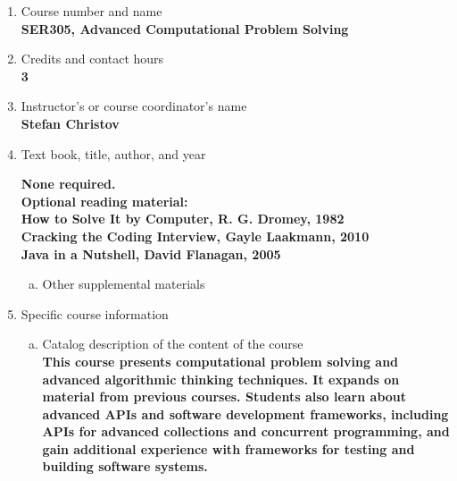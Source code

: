 \label{SER305}  %
\begin{enumerate}[1.]
\item Course number and name\\
  {\bfseries
    SER305, Advanced Computational Problem Solving
  }
  
\item Credits and contact hours\\
  {\bfseries
    3  %
  }

\item Instructor's or course coordinator's name\\
  {\bfseries
    Stefan Christov
  }

\item Text book, title, author, and year\\
  {\bfseries
    None required.\\
    Optional reading material:\\
    How to Solve It by Computer, R. G. Dromey, 1982\\
    Cracking the Coding Interview, Gayle Laakmann, 2010\\
    Java in a Nutshell, David Flanagan, 2005

  }
\begin{enumerate}[a.]
\item Other supplemental materials\\
  {\bfseries
    
  }
\end{enumerate}

\item Specific course information
\begin{enumerate}[a.]  
\item Catalog description of the content of the course\\
  {\bfseries
    This course presents computational problem solving and advanced algorithmic thinking techniques. It expands on material from previous courses. Students also learn about advanced APIs and software development frameworks, including APIs for advanced collections and concurrent programming, and gain additional experience with frameworks for testing and building software systems.
  }


\end{enumerate}
\end{enumerate}
